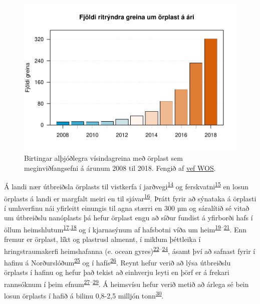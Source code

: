 \documentclass[icelandic,]{book}
\begin{document}
\begin{figure}[H]

{\centering \includegraphics[width=0.8\linewidth]{_bookdown_files/OrplastHaf_files/figure-latex/pubtrend-1} 

}

\caption{Birtingar alþjóðlegra vísindagreina með örplast sem meginviðfangsefni á árunum 2008 til 2018. Fengið af \href{https://webofknowledge.com}{vef WOS}.}\label{fig:pubtrend}
\end{figure}

Á landi nær útbreiðsla örplasts til vistkerfa í jarðvegi\textsuperscript{\protect\hyperlink{ref-de2018impacts}{14}} og ferskvatni\textsuperscript{\protect\hyperlink{ref-besseling2017fate}{15}} en losun örplasts á landi er margfalt meiri en til sjávar\textsuperscript{\protect\hyperlink{ref-horton2017microplastics}{16}}. Þrátt fyrir að sýnataka á örplasti í umhverfinu nái yfirleitt einungis til agna stærri en 300 µm og sáralítið sé vitað um útbreiðslu nanóplasts þá hefur örplast engu að síður fundist á yfirborði hafs í öllum heimshlutum\textsuperscript{\protect\hyperlink{ref-eriksen2014plastic}{17},\protect\hyperlink{ref-cozar2014plastic}{18}} og í kjarnasýnum af hafsbotni víða um heim\textsuperscript{\protect\hyperlink{ref-goldberg1997plasticizing}{19}--\protect\hyperlink{ref-woodall2014deep}{21}}. Enn fremur er örplast, líkt og plastrusl almennt, í miklum þéttleika í hringstraumakerfi heimshafanna (e. ocean gyres)\textsuperscript{\protect\hyperlink{ref-law2010plastic}{22}--\protect\hyperlink{ref-lebreton2018evidence}{24}}, ásamt því að safnast fyrir í hafinu á Norðurslóðum\textsuperscript{\protect\hyperlink{ref-cozar2017arctic}{25}} og í hafís\textsuperscript{\protect\hyperlink{ref-obbard2014global}{26}}. Reynt hefur verið að lýsa útbreiðslu örplasts í hafinu og hefur það tekist að einhverju leyti en þörf er á frekari rannsóknum í þeim efnum\textsuperscript{\protect\hyperlink{ref-enders2015abundance}{27}--\protect\hyperlink{ref-auta2017distribution}{29}}. Á heimsvísu hefur verið metið að árlega sé bein losun örplasts í hafið á bilinu 0,8-2,5 milljón tonn\textsuperscript{\protect\hyperlink{ref-boucher2017primary}{30}}.
\end{document}
